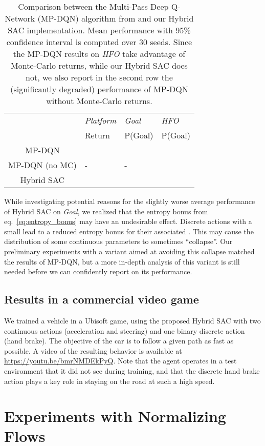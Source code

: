 \documentclass[letterpaper]{article} \usepackage{aaai20}  \usepackage{times}  \usepackage{helvet} \usepackage{courier}  \usepackage[hyphens]{url}  \usepackage{graphicx} \urlstyle{rm} \def\UrlFont{\rm}  \usepackage{graphicx}  \usepackage[section]{placeins}
\newcommand{\citet}{\cite}  \newcommand{\citep}{\cite} \DeclareMathOperator*{\softmax}{softmax}
\begin{document}
\begin{table}
\centering
\begin{tabular}{||c p{15mm} p{15mm} p{15mm}||} 
\hline
  & {\em Platform} & {\em Goal} & {\em HFO} \\ & Return & P(Goal) & P(Goal) \\
\hline\hline
MP-DQN &  &  &  \\ 
\hline
MP-DQN (no MC) & - & - &  \\
\hline
Hybrid SAC &  &  &  \\
\hline
\end{tabular}
\caption{Comparison between the Multi-Pass Deep Q-Network (MP-DQN) algorithm from \citet{bester2019} and our Hybrid SAC implementation.
Mean performance with 95\% confidence interval is computed over 30 seeds.
Since the MP-DQN results on {\em HFO} take advantage of Monte-Carlo returns, while our Hybrid SAC does not, we also report in the second row the (significantly degraded) performance of MP-DQN without Monte-Carlo returns.
}
\label{tab:mixed}
\end{table}

While investigating potential reasons for the slightly worse average performance of Hybrid SAC on {\em Goal}, we realized that the entropy bonus from eq.~\ref{eq:entropy_bonus} may have an undesirable effect.
Discrete actions with a small  lead to a reduced entropy bonus for their associated .
This may cause the distribution of some continuous parameters to sometimes ``collapse''.
Our preliminary experiments with a variant aimed at avoiding this collapse matched the results of MP-DQN, but a more in-depth analysis of this variant is still needed before we can confidently report on its performance.

\subsection{Results in a commercial video game}

We trained a vehicle in a Ubisoft game, using the proposed Hybrid SAC with two continuous actions (acceleration and steering) and one binary discrete action (hand brake). The objective of the car is to follow a given path as fast as possible. A video of the resulting behavior is available at \url{https://youtu.be/bmrNMDEkPyQ}. Note that the agent operates in a test environment that it did not see during training, and that the discrete hand brake action plays a key role in staying on the road at such a high speed.


\section{Experiments with Normalizing Flows}
\end{document}
